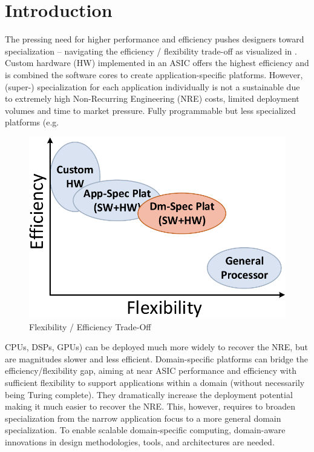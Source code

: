 \section{Introduction}
\label{sec:introduction}

The pressing need for higher performance and efficiency pushes designers toward specialization -- navigating the efficiency / flexibility trade-off as visualized in . Custom hardware (HW) implemented in an ASIC offers the highest efficiency and is combined the software cores to create application-specific platforms. However, (super-) specialization for each application individually is not a sustainable due to extremely high Non-Recurring Engineering (NRE) costs, limited deployment volumes and time to market pressure. Fully programmable but less specialized platforms (e.g. \begin{figure}
	\begin{center}
		\includegraphics[width=\linewidth]{fig/pTradeOff.pdf}
	\end{center}
	\caption{Flexibility / Efficiency Trade-Off}
	\label{fig:tradeOffArch}
	\vspace{-4pt}
\end{figure}
CPUs,  DSPs, GPUs) can be deployed much more widely to recover the NRE, but are magnitudes slower and less efficient. Domain-specific platforms can bridge the efficiency/flexibility gap, aiming at near ASIC performance and efficiency with sufficient flexibility to support applications within a domain (without necessarily being Turing complete). They dramatically increase the deployment potential making it much easier to recover the NRE. This, however,
requires to broaden specialization from the narrow application focus to a more general domain specialization. To enable scalable domain-specific computing, domain-aware innovations in design methodologies, tools, and architectures are needed. 





